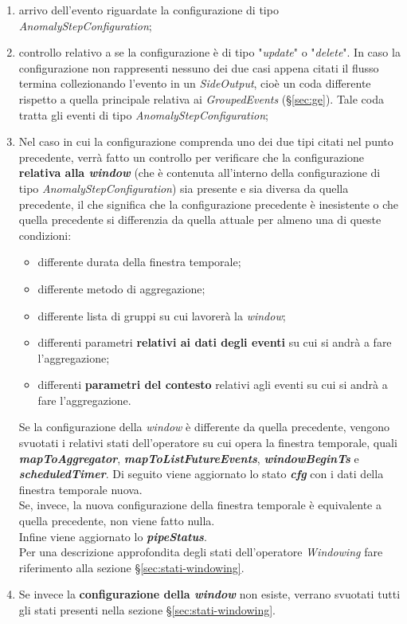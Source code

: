 \begin{enumerate}
	\item{arrivo dell'evento riguardate la configurazione di tipo \textit{AnomalyStepConfiguration};}
	\item{controllo relativo a se la configurazione è di tipo "\textit{update}" o "\textit{delete}". In caso la configurazione non rappresenti nessuno dei due casi appena citati il flusso termina collezionando l'evento in un \textit{SideOutput}, cioè un coda differente rispetto a quella principale relativa ai \textit{GroupedEvents} (\S\ref{sec:ge}). Tale coda tratta gli eventi di tipo \textit{AnomalyStepConfiguration};}
	\item{Nel caso in cui la configurazione comprenda uno dei due tipi citati nel punto precedente, verrà fatto un controllo per verificare che la configurazione \textbf{relativa alla \textit{window}} (che è contenuta all'interno della configurazione di tipo \textit{AnomalyStepConfiguration}) sia presente e sia diversa da quella precedente, il che significa che la configurazione precedente è inesistente o che quella precedente si differenzia da quella attuale per almeno una di queste condizioni:
	\begin{itemize}
		\item{differente durata della finestra temporale;}
		\item{differente metodo di aggregazione;}
		\item{differente lista di gruppi su cui lavorerà la \textit{window};}
		\item{differenti parametri \textbf{relativi ai dati degli eventi} su cui si andrà a fare l'aggregazione;}
		\item{differenti \textbf{parametri del contesto} relativi agli eventi su cui si andrà a fare l'aggregazione.}
	\end{itemize}
	
Se la configurazione della \textit{window} è differente da quella precedente, vengono svuotati i relativi stati dell'operatore su cui opera la finestra temporale, quali \textbf{\textit{mapToAggregator}}, \textbf{\textit{mapToListFutureEvents}}, \textbf{\textit{windowBeginTs}} e \textbf{\textit{scheduledTimer}}. Di seguito viene aggiornato lo stato \textbf{\textit{cfg}} con i dati della finestra temporale nuova.\\
Se, invece, la nuova configurazione della finestra temporale è equivalente a quella precedente, non viene fatto nulla.\\
Infine viene aggiornato lo \textbf{\textit{pipeStatus}}.\\
Per una descrizione approfondita degli stati dell'operatore \textit{Windowing} fare riferimento alla sezione \S\ref{sec:stati-windowing}.
}
\item{Se invece la \textbf{configurazione della \textit{window}} non esiste, verrano svuotati tutti gli stati presenti nella sezione \S\ref{sec:stati-windowing}.}
\end{enumerate}

